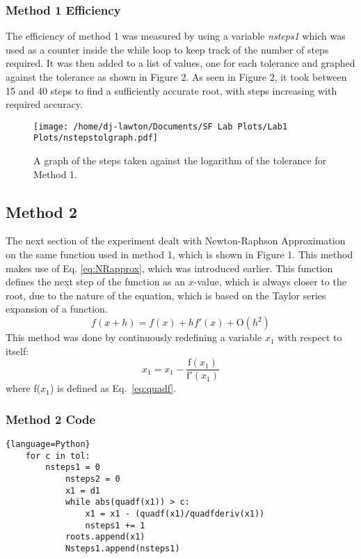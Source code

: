 \documentclass{article}
\begin{document}
\subsubsection{Method 1 Efficiency}
The efficiency of method 1 was measured by using a variable \textit{nsteps1} which was used as a counter inside the while loop to keep track of the number of steps required. It was then added to a list of values, one for each tolerance and graphed against the tolerance as shown in Figure 2. As seen in Figure 2, it took between 15 and 40 steps to find a sufficiently accurate root, with steps increasing with required accuracy. 

\begin{figure}[h]
\begin{flushleft}
	\texttt{[image: /home/dj-lawton/Documents/SF Lab Plots/Lab1 Plots/nstepstolgraph.pdf]}
	\caption{A graph of the steps taken against the logarithm of the tolerance for Method 1.}
\end{flushleft}
\label{fig:nsteps1}
\end{figure}


\subsection{Method 2}
The next section of the experiment dealt with Newton-Raphson Approximation on the same function used in method 1, which is shown in Figure 1. This method makes use of Eq. \ref{eq:NRapprox}, which was introduced earlier. This function defines the next step of the function as an $x$-value, which is always closer to the root, due to the nature of the equation, which is based on the Taylor series expansion of a function.
\begin{equation}
f(x+h) = f(x) + hf'(x) + \mathrm{O}(h^2)
\end{equation}
This method was done by continuously redefining a variable $x_1$ with respect to itself:
\begin{equation}
x_1 = x_1 - \frac{\mathrm{f}(x_1)}{\mathrm{f}'(x_1)}
\end{equation}
where f($x_1$) is defined as Eq.~\ref{eq:quadf}.
\subsubsection{Method 2 Code}
\begin{lstlisting}{language=Python}
	for c in tol:
		nsteps1 = 0
    		nsteps2 = 0
    		x1 = d1
    		while abs(quadf(x1)) > c:
        		x1 = x1 - (quadf(x1)/quadfderiv(x1))
        		nsteps1 += 1
    		roots.append(x1)
    		Nsteps1.append(nsteps1)
\end{lstlisting}
\end{document}
